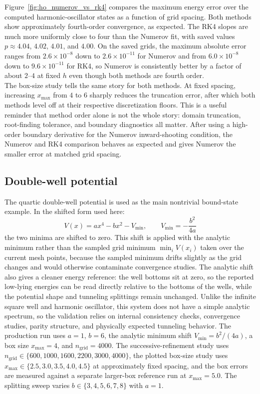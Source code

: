 \documentclass[11pt]{article}
\begin{document}
\begin{refsection}
                Figure~\ref{fig:ho_numerov_vs_rk4} compares the maximum energy error over the computed harmonic-oscillator states as a function of grid spacing. Both methods show approximately fourth-order convergence, as expected. The RK4 slopes are much more uniformly close to four than the Numerov fit, with saved values $p\approx4.04$, $4.02$, $4.01$, and $4.00$. On the saved grids, the maximum absolute error ranges from $2.6\times10^{-8}$ down to $2.6\times10^{-11}$ for Numerov and from $6.0\times10^{-8}$ down to $9.6\times10^{-11}$ for RK4, so Numerov is consistently better by a factor of about $2$--$4$ at fixed $h$ even though both methods are fourth order. \\

                The box-size study tells the same story for both methods. At fixed spacing, increasing $x_{\max}$ from $4$ to $6$ sharply reduces the truncation error, after which both methods level off at their respective discretization floors. This is a useful reminder that method order alone is not the whole story: domain truncation, root-finding tolerance, and boundary diagnostics all matter. After using a high-order boundary derivative for the Numerov inward-shooting condition, the Numerov and RK4 comparison behaves as expected and gives Numerov the smaller error at matched grid spacing.

        \subsection{Double-well potential}
            The quartic double-well potential is used as the main nontrivial bound-state example. In the shifted form used here:
            \begin{equation}
            V(x)=ax^4-bx^2-V_{\min}, \qquad V_{\min}=-\frac{b^2}{4a}
            \end{equation}
            the two minima are shifted to zero. This shift is applied with the analytic minimum rather than the sampled grid minimum $\min_i V(x_i)$ taken over the current mesh points, because the sampled minimum drifts slightly as the grid changes and would otherwise contaminate convergence studies. The analytic shift also gives a cleaner energy reference: the well bottoms sit at zero, so the reported low-lying energies can be read directly relative to the bottoms of the wells, while the potential shape and tunneling splittings remain unchanged. Unlike the infinite square well and harmonic oscillator, this system does not have a simple analytic spectrum, so the validation relies on internal consistency checks, convergence studies, parity structure, and physically expected tunneling behavior. The production run uses $a=1$, $b=6$, the analytic minimum shift $V_{\min}=b^2/(4a)$, a box size $x_{\max}=4$, and $n_{\text{grid}}=4000$. The successive-refinement study uses $n_{\text{grid}}\in\{600,1000,1600,2200,3000,4000\}$, the plotted box-size study uses $x_{\max}\in\{2.5,3.0,3.5,4.0,4.5\}$ at approximately fixed spacing, and the box errors are measured against a separate larger-box reference run at $x_{\max}=5.0$. The splitting sweep varies $b\in\{3,4,5,6,7,8\}$ with $a=1$. \\


\end{refsection}
\end{document}
